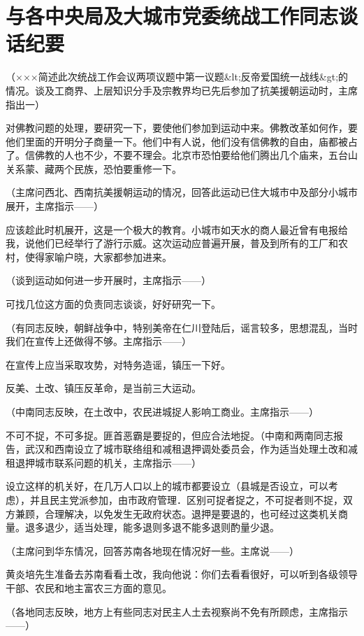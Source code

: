 \section[与各中央局及大城市党委统战工作同志谈话纪要（一九五一年一月十九日）]{与各中央局及大城市党委统战工作同志谈话纪要}


（×××简述此次统战工作会议两项议题中第一议题&lt;反帝爱国统一战线&gt;的情况。谈及工商界、上层知识分手及宗教界均已先后参加了抗美援朝运动时，主席指出一）

对佛教问题的处理，要研究一下，要使他们参加到运动中来。佛教改革如何作，要他们里面的开明分子商量一下。他们中有人说，他们没有信佛教的自由，庙都被占了。信佛教的人也不少，不要不理会。北京市恐怕要给他们腾出几个庙来，五台山关系蒙、藏两个民族，恐怕要重修一下。

（主席问西北、西南抗美援朝运动的情况，回答此运动已住大城市中及部分小城市展开，主席指示——）

应该趁此时机展开，这是一个极大的教育。小城市如天水的商人最近曾有电报给我，说他们已经举行了游行示威。这次运动应普遍开展，普及到所有的工厂和农村，使得家喻户晓，大家都参加进来。

（谈到运动如何进一步开展时，主席指示——）

可找几位这方面的负责同志谈谈，好好研究一下。

（有同志反映，朝鲜战争中，特别美帝在仁川登陆后，谣言较多，思想混乱，当时我们在宣传上还做得不够。主席指示——）

在宣传上应当采取攻势，对特务造谣，镇压一下好。

反美、土改、镇压反革命，是当前三大运动。

（中南同志反映，在土改中，农民进城捉人影响工商业。主席指示——）

不可不捉，不可多捉。匪首恶霸是要捉的，但应合法地捉。（中南和两南同志报告，武汉和西南设立了城市联络组和减租退押调处委员会，作为适当处理土改和减租退押城市联系问题的机关，主席指示——）

设立这样的机关好，在几万人口以上的城市都要设立（县城是否设立，可以考虑），并且民主党派参加，由市政府管理．区别可捉者捉之，不可捉者则不捉，双方兼顾，合理解决，以免发生无政府状态。退押是要退的，也可经过这类机关商量。退多退少，适当处理，能多退则多退不能多退则酌量少退。

（主席问到华东情况，回答苏南各地现在情况好一些。主席说——）

黄炎培先生准备去苏南看看土改，我向他说：你们去看看很好，可以听到各级领导干部、农民和地主富农三方面的意见。

（各地同志反映，地方上有些同志对民主人土去视察尚不免有所顾虑，主席指示——）

